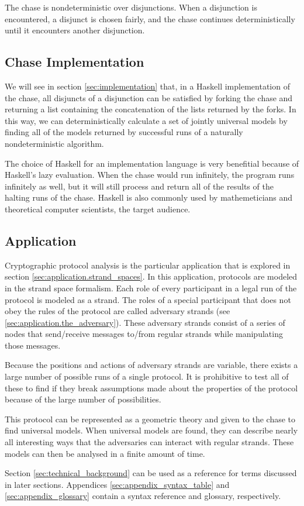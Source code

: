 		The chase is nondeterministic over disjunctions. When a disjunction is
		encountered, a disjunct is chosen fairly, and the chase continues
		deterministically until it encounters another disjunction.

	\subsection{Chase Implementation}

		We will see in section \ref{sec:implementation} that, in a Haskell
		implementation of the chase, all disjuncts of a disjunction can be
		satisfied by forking the chase and returning a list containing the
		concatenation of the lists returned by the forks. In this way, we can
		deterministically calculate a set of jointly universal models by finding
		all of the models returned by successful runs of a naturally
		nondeterministic algorithm.

		The choice of Haskell for an implementation language is very benefitial
		because of Haskell's lazy evaluation. When the chase would run
		infinitely, the program runs infinitely as well, but it will still
		process and return all of the results of the halting runs of the chase.
		Haskell is also commonly used by mathemeticians and theoretical
		computer scientists, the target audience.

	\subsection{Application}

		Cryptographic protocol analysis is the particular application that is
		explored in section \ref{sec:application.strand_spaces}. In this
		application, protocols are modeled in the strand space formalism. Each
		role of every participant in a legal run of the protocol is modeled as
		a strand. The roles of a special participant that does not obey the
		rules of the protocol are called adversary strands (see
		\ref{sec:application.the_adversary}). These adversary strands consist
		of a series of nodes that send/receive messages to/from regular strands
		while manipulating those messages.

		Because the positions and actions of adversary strands are variable,
		there exists a large number of possible runs of a single protocol. It
		is prohibitive to test all of these to find if they break assumptions
		made about the properties of the protocol because of the large number
		of possibilities.

		This protocol can be represented as a geometric theory and given to the
		chase to find universal models. When universal models are found, they can
		describe nearly all interesting ways that the adversaries can interact
		with regular strands. These models can then be analysed in a finite
		amount of time.

	Section \ref{sec:technical_background} can be used as a reference for terms
	discussed in later sections. Appendices \ref{sec:appendix_syntax_table} and
	\ref{sec:appendix_glossary} contain a syntax reference and glossary,
	respectively.
